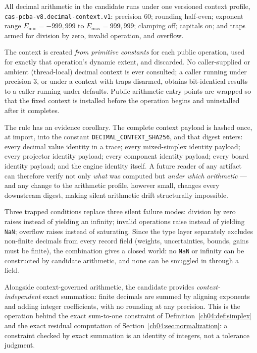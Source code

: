 All decimal arithmetic in the candidate runs under one versioned context
profile, \texttt{cas-pcba-v8.decimal-context.v1}: precision $60$;
rounding half-even; exponent range $E_{\min} = -999{,}999$ to
$E_{\max} = 999{,}999$; clamping off; capitals on; and traps armed for
division by zero, invalid operation, and overflow.

\begin{ruleenv}\label{ch04:rule:context}
The context is created \emph{from primitive constants} for each public
operation, used for exactly that operation's dynamic extent, and discarded.
No caller-supplied or ambient (thread-local) decimal context is ever
consulted; a caller running under precision $3$, or under a context with
traps disarmed, obtains bit-identical results to a caller running under
defaults. Public arithmetic entry points are wrapped so that the fixed
context is installed before the operation begins and uninstalled after it
completes.
\end{ruleenv}

The rule has an evidence corollary. The complete context payload is hashed
once, at import, into the constant \texttt{DECIMAL\_CONTEXT\_SHA256}, and
that digest enters: every decimal value identity in a trace; every
mixed-simplex identity payload; every projector identity payload; every
component identity payload; every board identity payload; and the engine
identity itself. A future reader of any artifact can therefore verify not
only \emph{what} was computed but \emph{under which arithmetic} --- and any
change to the arithmetic profile, however small, changes every downstream
digest, making silent arithmetic drift structurally impossible.

Three trapped conditions replace three silent failure modes: division by
zero raises instead of yielding an infinity; invalid operations raise
instead of yielding \texttt{NaN}; overflow raises instead of saturating.
Since the type layer separately excludes non-finite decimals from every
record field (weights, uncertainties, bounds, gains must be finite), the
combination gives a closed world: no \texttt{NaN} or infinity can be
constructed by candidate arithmetic, and none can be smuggled in through a
field.

Alongside context-governed arithmetic, the candidate provides
\emph{context-independent} exact summation: finite decimals are summed by
aligning exponents and adding integer coefficients, with no rounding at any
precision. This is the operation behind the exact sum-to-one constraint of
Definition~\ref{ch04:def:simplex} and the exact residual computation of
Section~\ref{ch04:sec:normalization}: a constraint checked by exact
summation is an identity of integers, not a tolerance judgment.

